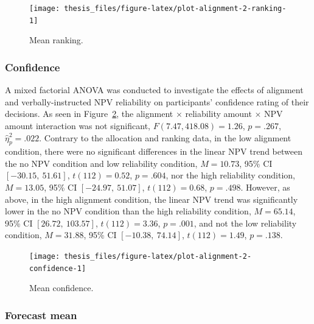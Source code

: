 \documentclass[a4paper, nobind, dvipsnames]{templates/ociamthesis}
\theoremstyle{definition}
\theoremstyle{definition}
\theoremstyle{definition}
\theoremstyle{definition}
\theoremstyle{remark}
\begin{document}
\begin{figure}
\texttt{[image: thesis\_files/figure-latex/plot-alignment-2-ranking-1]} \caption{Mean ranking.}\label{fig:plot-alignment-2-ranking}
\end{figure}

\subsubsection{Confidence}

A mixed factorial ANOVA was conducted to investigate the effects of alignment
and verbally-instructed NPV reliability on participants' confidence rating of
their decisions. As seen in Figure~\ref{fig:plot-alignment-2-confidence}, the
alignment \(\times\) reliability amount \(\times\) NPV amount interaction was not
significant,
\(F(7.47, 418.08) = 1.26\), \(p = .267\), \(\hat{\eta}^2_p = .022\).
Contrary to the allocation and ranking data, in
the low alignment condition, there were no significant differences in the linear
NPV trend between the no NPV condition and low reliability condition,
\(M = 10.73\), 95\% CI \([-30.15,~51.61]\), \(t(112) = 0.52\), \(p = .604\), nor the high
reliability condition, \(M = 13.05\), 95\% CI \([-24.97,~51.07]\), \(t(112) = 0.68\), \(p = .498\).
However, as above, in the high alignment condition, the linear NPV trend was
significantly lower in the no NPV condition than the high reliability condition,
\(M = 65.14\), 95\% CI \([26.72,~103.57]\), \(t(112) = 3.36\), \(p = .001\), and not the low
reliability condition, \(M = 31.88\), 95\% CI \([-10.38,~74.14]\), \(t(112) = 1.49\), \(p = .138\).



\begin{figure}
\texttt{[image: thesis\_files/figure-latex/plot-alignment-2-confidence-1]} \caption{Mean confidence.}\label{fig:plot-alignment-2-confidence}
\end{figure}

\subsubsection{Forecast mean}
\end{document}
